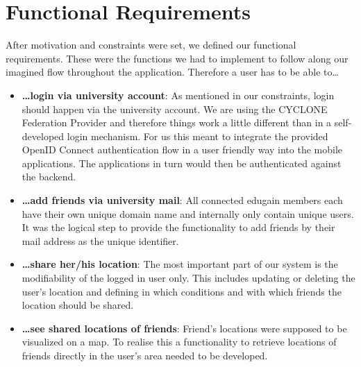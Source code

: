 \vspace{0.5cm}

\section{Functional Requirements}

After motivation and constraints were set, we defined our functional requirements. These were the functions we had to implement to follow along our imagined flow throughout the application. Therefore a user has to be able to\ldots

\begin{itemize}
    \item \textbf{\ldots login via university account}: As mentioned in our constraints, login should happen via the university account. We are using the CYCLONE Federation Provider and therefore things work a little different than in a self-developed login mechanism. For us this meant to integrate the provided OpenID Connect authentication flow in a user friendly way into the mobile applications. The applications in turn would then be authenticated against the backend.
    \item \textbf{\ldots add friends via university mail}: All connected edugain members each have their own unique domain name and internally only contain unique users. It was the logical step to provide the functionality to add friends by their mail address as the unique identifier.
    \item \textbf{\ldots share her/his location}: The most important part of our system is the modifiability of the logged in user only. This includes updating or deleting the user's location and defining in which conditions and with which friends the location should be shared.
    \item \textbf{\ldots see shared locations of friends}: Friend's locations were supposed to be visualized on a map. To realise this a functionality to retrieve locations of friends directly in the user's area needed to be developed.
\end{itemize}
